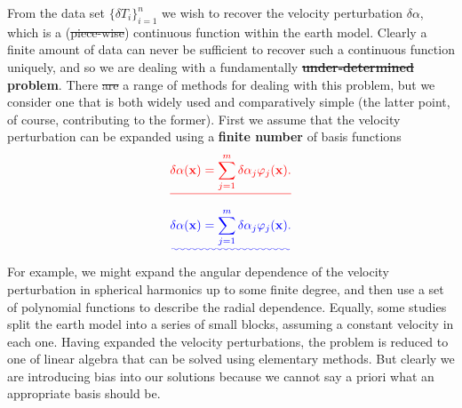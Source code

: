 \documentclass[a4paper,12pt]{paper}
\providecommand{\DIFadd}[1]{{\protect\color{blue}\uwave{#1}}} %
\providecommand{\DIFdel}[1]{{\protect\color{red}\sout{#1}}}                      %
\providecommand{\DIFaddbegin}{} %
\providecommand{\DIFaddend}{} %
\providecommand{\DIFdelbegin}{} %
\providecommand{\DIFdelend}{} %
\begin{document}
From the data set $\{\delta T_{i}\}_{i=1}^{n}$ we wish to recover the velocity perturbation $\delta\alpha$, which is a (\DIFdelbegin \DIFdel{piece-wise}\DIFdelend \DIFaddbegin \DIFadd{piecewise}\DIFaddend ) 
continuous function within the earth model. Clearly a finite amount of data can never be sufficient to recover such a continuous 
function uniquely, and so we are dealing with a fundamentally \textbf{\DIFdelbegin \DIFdel{under-determined }\DIFdelend \DIFaddbegin \DIFadd{underdetermined }\DIFaddend problem}. There \DIFdelbegin \DIFdel{are }\DIFdelend \DIFaddbegin \DIFadd{is }\DIFaddend a range of methods for dealing with 
this problem, but we consider one that is both widely used and comparatively simple (the latter point, of course, contributing to the 
former). First we assume that the velocity perturbation can be expanded using a \textbf{finite number} of basis functions
\DIFdelbegin \begin{displaymath}
    \DIFdel{\delta\alpha(\mathbf{x}) = \sum_{j=1}^{m} \delta\alpha_{j} \varphi_{j}(\mathbf{x}).
}\end{displaymath}%
\DIFdelend \DIFaddbegin \begin{equation}
    \DIFadd{\delta\alpha(\mathbf{x}) = \sum_{j=1}^{m} \delta\alpha_{j} \varphi_{j}(\mathbf{x}).
    \label{eq:8}
}\end{equation}\DIFaddend 
For example, we might expand the angular dependence of the velocity perturbation in spherical harmonics up to some finite degree, 
and then use a set of polynomial functions to describe the radial dependence. Equally, some studies split the earth model into a 
series of small blocks, assuming a constant velocity in each one. Having expanded the velocity perturbations, the problem is reduced 
to one of linear algebra that can be solved using elementary methods. But clearly we are introducing bias into our solutions because 
we cannot say a priori what an appropriate basis should be.
\end{document}

